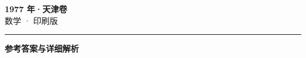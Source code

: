 \documentclass[zihao=5, a4paper]{ctexart}
\begin{document}
\begin{center}
  {\Large\bfseries 1977 年·天津卷}\\[4pt]
  {\large 数学 · 印刷版}
\end{center}
\medskip
{}

\par\bigskip\hrule\bigskip
{}
\begin{center}{\large\bfseries 参考答案与详细解析}\end{center}
\smallskip

\end{document}
